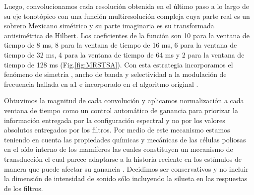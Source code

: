 Luego, convolucionamos cada resolución obtenida en el último paso a lo largo de su eje tonotópico con una función multiresolución compleja cuya parte real es un sobrero Mexicano simétrico y su parte imaginaria es su transformada antisimétrica de Hilbert. Los coeficientes de la función son 10 para la ventana de tiempo de 8 ms, 8 para la ventana de tiempo de 16 ms, 6 para la ventana de tiempo de 32 ms, 4 para la ventana de tiempo de 64 ms y 2 para la ventana de tiempo de 128 ms (Fig.\ref{fig:MRSTSA}). Con esta estrategia incorporamos el fenómeno de simetría \cite{shamma_1993}, ancho de banda \cite{schreiner_1990} y selectividad a la modulación de frecuencia \cite{shamma_1993,heil_1992,mendelson_1985} hallada en \gls{a1} e incorporado en el algoritmo original \cite{wang_1995}.


Obtuvimos la magnitud de cada convolución y aplicamos normalización a cada ventana de tiempo como un control automático de ganancia para priorizar la información entregada por la configuración espectral y no por los valores absolutos entregados por los filtros. Por medio de este mecanismo estamos teniendo en cuenta las propiedades químicas y mecánicas de las células poliosas en el oído interno de los mamíferos las cuales constituyen un mecanismo de transducción el cual parece adaptarse a la historia reciente en los estímulos de manera que puede afectar su ganancia \cite{eatock_2000,holt_2000,le_goff_2005}. Decidimos ser conservativos y no incluir la dimensión de intensidad de sonido sólo incluyendo la silueta en las respuestas de los filtros. 


